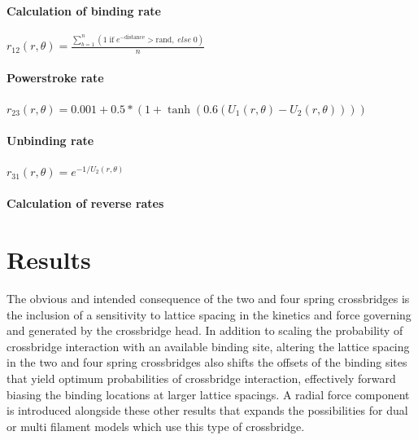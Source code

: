 \documentclass[]{article}
\begin{document}

\paragraph{Calculation of binding rate} %
$r_{12}(r, \theta) = \frac{\sum_{b=1}^n (1\; \textrm{if}\; e^{-\textrm{distance}}>\textrm{rand} ,\; else\; 0)}{n} $



\paragraph{Powerstroke rate} %

$r_{23}(r, \theta) = 0.001 + 0.5 * (1 + \tanh(0.6 (U_1(r, \theta) - U_2(r, \theta)))) $


\paragraph{Unbinding rate} %

$r_{31}(r, \theta) = e^{-1 / U_2(r, \theta)}$

\paragraph{Calculation of reverse rates} %



\section{Results} %


The obvious and intended consequence of the two and four spring crossbridges is the inclusion of a sensitivity to lattice spacing in the kinetics and force governing and generated by the crossbridge head. 
In addition to scaling the probability of crossbridge interaction with an available binding site, altering the lattice spacing in the two and four spring crossbridges also shifts the offsets of the binding sites that yield optimum probabilities of crossbridge interaction, effectively forward biasing the binding locations at larger lattice spacings.
A radial force component is introduced alongside these other results that expands the possibilities for dual or multi filament models which use this type of crossbridge.
\end{document}
